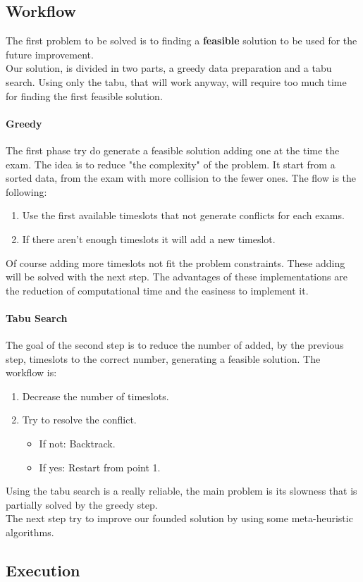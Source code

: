\documentclass[12pt]{article}
\begin{document}
\subsection{Workflow}
The first problem to be solved is to finding a \textbf{feasible} solution to be used for the future improvement.\\
Our solution, is divided in two parts, a greedy data preparation and a tabu search. Using only the tabu, that will work anyway, will require too much time for finding the first feasible solution.\\
\paragraph{Greedy} The first phase try do generate a feasible solution adding one at the time the exam. The idea is to reduce "the complexity" of the problem. It start from a sorted data, from the exam with more collision to the fewer ones. The flow is the following:
\begin{enumerate}
  \item Use the first available timeslots that not generate conflicts for each exams.
  \item If there aren't enough timeslots it will add a new timeslot.
\end{enumerate}
Of course adding more timeslots not fit the problem constraints. These adding will be solved with the next step. The advantages of these implementations are the reduction of computational time and the easiness to implement it.

\paragraph{Tabu Search} The goal of the second step is to reduce the number of added, by the previous step, timeslots
to the correct number, generating a feasible solution. The workflow is:
\begin{enumerate}
  \item Decrease the number of timeslots.
  \item Try to resolve the conflict.
  \begin{itemize}
    \item If not: Backtrack.
    \item If yes: Restart from point 1.
  \end{itemize}
\end{enumerate}
Using the tabu search is a really reliable, the main problem is its slowness that is partially solved by the greedy step.\\

The next step try to improve our founded solution by using some meta-heuristic algorithms.


\subsection{Execution}
\end{document}
